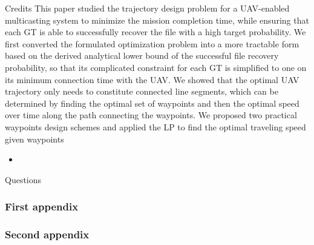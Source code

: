 \documentclass[utf8, a4paper]{beamer}
\begin{document}
\begin{bibunit}[plain]
\begin{frame}
  {Credits}
This paper studied the trajectory design problem for a
UAV-enabled multicasting system to minimize the mission
completion time, while ensuring that each GT is able to
successfully recover the file with a high target probability.
We first converted the formulated optimization problem into
a more tractable form based on the derived analytical lower
bound of the successful file recovery probability, so that its
complicated constraint for each GT is simplified to one on
its minimum connection time with the UAV. We showed that
the optimal UAV trajectory only needs to constitute connected
line segments, which can be determined by finding the optimal
set of waypoints and then the optimal speed over time along
the path connecting the waypoints. We proposed two practical
waypoints design schemes and applied the LP to find the
optimal traveling speed given waypoints
  \begin{itemize}
 \item
  \end{itemize}

  \nocite{ipsum}
  

\end{frame}
\end{bibunit}

\begin{bibunit}[plain]
\begin{frame}
  {Questions}

  \nocite{lorem}
  

\end{frame}
\end{bibunit}


\appendix[Appendices]

\begin{frame}
  \frametitle{First appendix}
\end{frame}

\begin{frame}
  \frametitle{Second appendix}
\end{frame}
\end{document}
